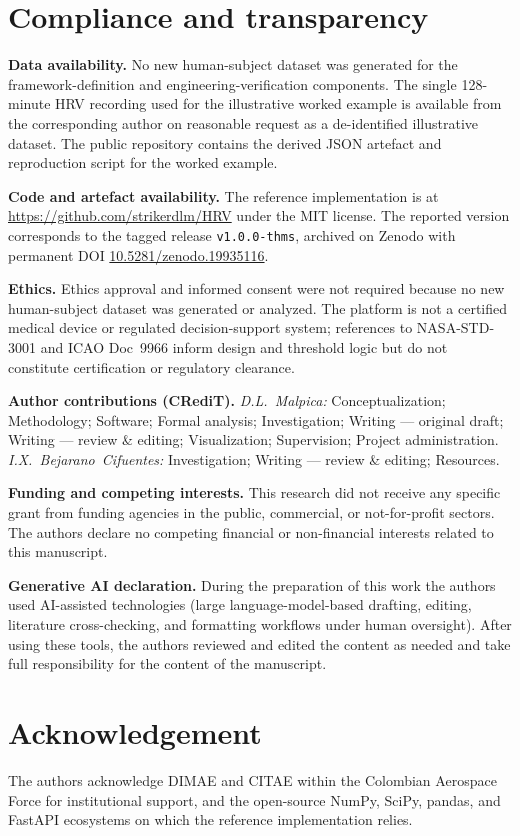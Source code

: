 \documentclass[10pt,journal,twocolumn,compsoc]{IEEEtran}
\begin{document}
\section*{Compliance and transparency}
\noindent\textbf{Data availability.} No new human-subject dataset was generated for the framework-definition and engineering-verification components. The single 128-minute HRV recording used for the illustrative worked example is available from the corresponding author on reasonable request as a de-identified illustrative dataset. The public repository contains the derived JSON artefact and reproduction script for the worked example.

\noindent\textbf{Code and artefact availability.} The reference implementation is at \url{https://github.com/strikerdlm/HRV} under the MIT license. The reported version corresponds to the tagged release \texttt{v1.0.0-thms}, archived on Zenodo with permanent DOI \href{https://doi.org/10.5281/zenodo.19935116}{10.5281/zenodo.19935116}.

\noindent\textbf{Ethics.} Ethics approval and informed consent were not required because no new human-subject dataset was generated or analyzed. The platform is not a certified medical device or regulated decision-support system; references to NASA-STD-3001 \cite{nasa2023} and ICAO Doc~9966 \cite{icao2020} inform design and threshold logic but do not constitute certification or regulatory clearance.

\noindent\textbf{Author contributions (CRediT).} \textit{D.L.~Malpica:} Conceptualization; Methodology; Software; Formal analysis; Investigation; Writing --- original draft; Writing --- review \& editing; Visualization; Supervision; Project administration. \textit{I.X.~Bejarano~Cifuentes:} Investigation; Writing --- review \& editing; Resources.

\noindent\textbf{Funding and competing interests.} This research did not receive any specific grant from funding agencies in the public, commercial, or not-for-profit sectors. The authors declare no competing financial or non-financial interests related to this manuscript.

\noindent\textbf{Generative AI declaration.} During the preparation of this work the authors used AI-assisted technologies (large language-model-based drafting, editing, literature cross-checking, and formatting workflows under human oversight). After using these tools, the authors reviewed and edited the content as needed and take full responsibility for the content of the manuscript.

\section*{Acknowledgement}
The authors acknowledge DIMAE and CITAE within the Colombian Aerospace Force for institutional support, and the open-source NumPy, SciPy, pandas, and FastAPI ecosystems on which the reference implementation relies.



\end{document}
